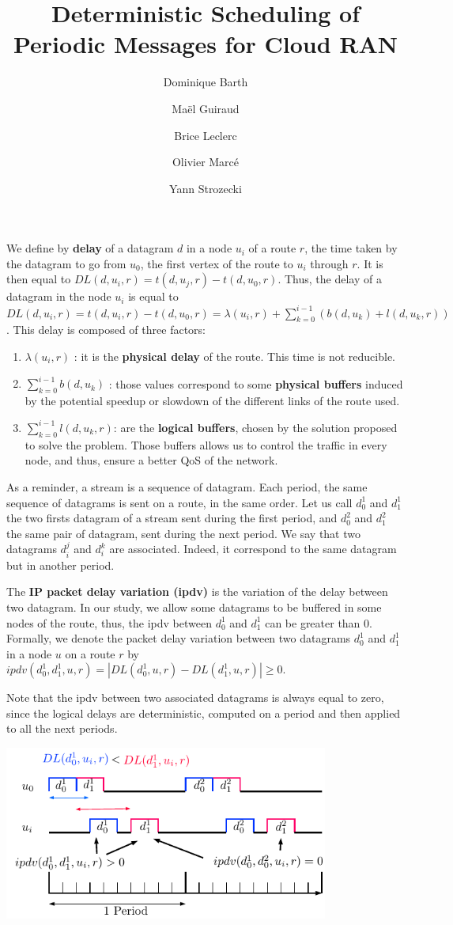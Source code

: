 \documentclass[10pt]{article}
\title{Deterministic Scheduling of Periodic Messages for Cloud RAN}
\author[1]{Dominique Barth}
\author[1,2]{Ma\"el Guiraud}
\author[2]{Brice Leclerc}
\author[2]{Olivier Marc\'e}
\author[1]{Yann Strozecki}
\affil[1]{David Laboratory, UVSQ}
\affil[2]{Nokia Bell Labs France}
\begin{document}
We define by {\bf delay} of a datagram $d$ in a node $u_i$ of a route $r$, the time taken by the datagram to go from $u_0$, the first vertex of the route to $u_i$ through $r$. It is then equal to $DL(d,u_i,r) = t(d,u_j,r) - t(d,u_0,r)$. 
 Thus, the delay of a datagram in the node $u_i$ is equal to $DL(d,u_i,r) =  t(d,u_i,r) - t(d,u_0,r) = \lambda(u_i,r) + \sum_{k=0}^{i-1}( b(d,u_k) + l(d,u_k,r))$.
This delay is composed of three factors:
\begin{enumerate}
\item $\lambda(u_i,r)$ : it is the {\bf physical delay} of the route. This time is not reducible. 
\item  $\sum_{k=0}^{i-1} b(d,u_k)$ : those values correspond to some {\bf physical buffers } induced by the potential speedup or slowdown of the different links of the route used.
\item $\sum_{k=0}^{i-1} l(d,u_k,r)$: are the {\bf logical buffers}, chosen by the solution proposed to solve the problem. Those buffers allows us to control the traffic in every node, and thus, ensure a better QoS of the network.
\end{enumerate}

As a reminder, a stream is a sequence of datagram. Each period, the same sequence of datagrams is sent on a route, in the same order. Let us call $d_0^1$ and $d_1^1$ the two firsts datagram of a stream sent during the first period, and $d_0^2$ and $d_1^2$ the same pair of datagram, sent during the next period. We say that two datagrams $d_i^j$ and $d_i^k$ are associated. Indeed, it correspond to the same datagram but in another period.

The {\bf IP packet delay variation (ipdv) }\cite{demichelis_ip_nodate} is the variation of the delay between two datagram. In our study, we allow some datagrams to be buffered in some nodes of the route, thus, the ipdv between $d_0^1$ and $d_1^1$ can be greater than $0$. Formally, we denote the packet delay variation between two datagrams $d_0^1$ and $d_1^1$ in a node $u$ on a route $r$ by $ipdv(d_0^1,d_1^1,u,r) = |DL(d_0^1,u,r) - DL(d_1^1,u,r) | \ge 0$. 

Note that the ipdv between two associated datagrams is always equal to zero, since the logical delays are deterministic, computed on a period and then applied to all the next periods.

\centering
\includegraphics[width=0.8\textwidth]{ipdv}
  
\end{document}
